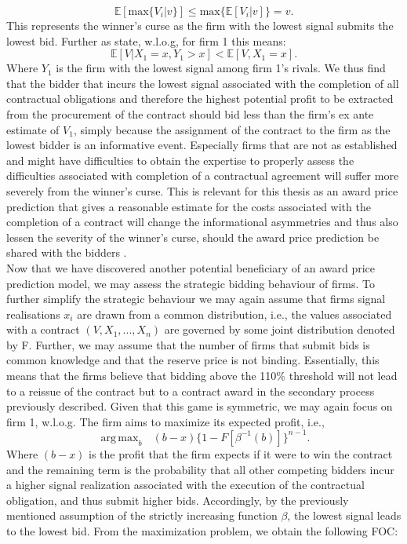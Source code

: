 \documentclass[a4paper,12pt, headsepline]{scrartcl}
\DeclareMathOperator*{\argmaxA}{arg\,max}
\numberwithin{equation}{section}
\begin{document}
\[
\mathbb{E}[\text{max}\{V_i|v\}] \leq \text{max}\{{\mathbb{E}[V_i|v]}\} = v.
\] 
This represents the winner's curse as the firm with the lowest signal submits the lowest bid. Further as \citet{milgrom82} state, w.l.o.g, for firm 1 this means:
\[
\mathbb{E}[V|X_1 = x, Y_1 > x] < \mathbb{E}[V, X_1 = x].
\]
Where $Y_1$ is the firm with the lowest signal among firm 1's rivals. We thus find that the bidder that incurs the lowest signal associated with the completion of all contractual obligations and therefore the highest potential profit to be extracted from the procurement of the contract should bid less than the firm's ex ante estimate of $V_1$, simply because the assignment of the contract to the firm as the lowest bidder is an informative event. Especially firms that are not as established and might have difficulties to obtain the expertise to properly assess the difficulties associated with completion of a contractual agreement will suffer more severely from the winner's curse. This is relevant for this thesis as an award price prediction that gives a reasonable estimate for the costs associated with the completion of a contract will change the informational asymmetries and thus also lessen the severity of the winner's curse, should the award price prediction be shared with the bidders \citep{GarciaRodriguez2020}.\\
Now that we have discovered another potential beneficiary of an award price prediction model, we may assess the strategic bidding behaviour of firms. To further simplify the strategic behaviour we may again assume that firms signal realisations $x_i$ are drawn from a common distribution, i.e., the values associated with a contract $(V, X_1, ..., X_n)$ are governed by some joint distribution denoted by F. Further, we may assume that the number of firms that submit bids is common knowledge and that the reserve price is not binding. Essentially, this means that the firms believe that bidding above the 110\% threshold will not lead to a reissue of the contract but to a contract award in the secondary process previously described. Given that this game is symmetric, we may again focus on firm 1, w.l.o.g. The firm aims to maximize its expected profit, i.e.,
\[
\argmaxA_b \text{ } (b - x)\{1 - F[\beta^{-1}(b)]\}^{n-1}.
\]
Where $(b - x)$ is the profit that the firm expects if it were to win the contract and the remaining term is the probability that all other competing bidders incur a higher signal realization associated with the execution of the contractual obligation, and thus submit higher bids. Accordingly, by the previously mentioned assumption of the strictly increasing function $\beta$, the lowest signal leads to the lowest bid. From the maximization problem, we obtain the following FOC:
\end{document}
